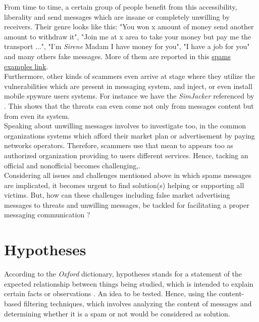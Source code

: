 \documentclass[12pt,a4paper, oneside]{book}
\begin{document}
	From time to time, a certain group of people benefit from this accessibility, liberality and send messages which are insane or completely unwilling by receivers. Their genre looks like this: "You won x amount of money send another amount to withdraw it", "Join me at x area to take your money but pay me the transport ...", "I'm \textit{Sirene} Madam I have money for you", "I have a job for you" and many others fake messages. More of them are reported in this  \href{ https://blog.textedly.com/spam-text-message-examples}{spams examples link}.  \\
		
	Furthermore, other kinds of scammers even arrive at stage where they utilize the vulnerabilities which are present in messaging system, and inject, or even install mobile spyware users systems. For instance we have the \textit{SimJacker} referenced by \cite{cimpanu2019simjacker}. This shows that the threats can even come not only from messages content but from even its system. \\
	
	Speaking about unwilling messages involves to investigate too, in the common organizations systems which afford their market plan or advertisement by paying networks operators. Therefore, scammers use that mean to appears too as authorized organization providing to users different services. Hence, tacking an official and nonofficial becomes challenging\cite{chen2017survey},\cite{leppaniemi2008mobile}.\\
		
	Considering all issues and challenges mentioned above in which spams messages are implicated, it becomes urgent to find solution(s) helping or supporting all victims. But, how can these challenges including false market advertising messages to threats and unwilling messages, be tackled for facilitating a proper messaging communication ?	
	\section{Hypotheses}  
	 According to the \textit{Oxford} dictionary, hypotheses stands for a statement of the expected relationship between things being studied, which is intended to explain certain facts or observations \cite{park2012dictionary}. An idea to be tested.
	 Hence, using the content-based filtering techniques, which involves analyzing the content of messages and determining whether it is a spam or not would be considered as solution. \\
	 
\end{document}
